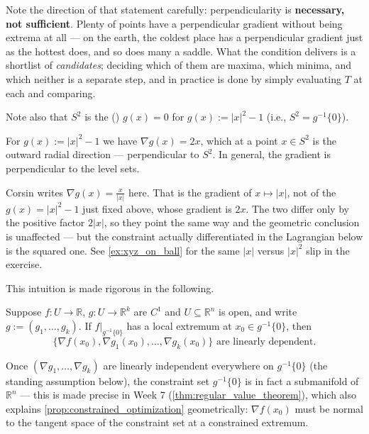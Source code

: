 Note the direction of that statement carefully: perpendicularity is \textbf{necessary, not
sufficient}. Plenty of points have a perpendicular gradient without being extrema at all --- on
the earth, the coldest place has a perpendicular gradient just as the hottest does, and so does
many a saddle. What the condition delivers is a shortlist of \emph{candidates}; deciding which
of them are maxima, which minima, and which neither is a separate step, and in practice is done
by simply evaluating $T$ at each and comparing.

Note also that $S^2$ is the  () $g(x) = 0$ for
$g(x) := |x|^2 - 1$ (i.e., $S^2 = g^{-1}\{0\}$).

\begin{remark}
For $g(x) := |x|^2-1$ we have $\nabla g(x) = 2x$, which at a point $x \in S^2$ is the outward
radial direction --- perpendicular to $S^2$. In general, the gradient is perpendicular to the
level sets.
\end{remark}

\begin{ainote}
Corsin writes $\nabla g(x) = \tfrac{x}{|x|}$ here. That is the gradient of $x \mapsto |x|$, not
of the $g(x) = |x|^2-1$ just fixed above, whose gradient is $2x$. The two differ only by the
positive factor $2|x|$, so they point the same way and the geometric conclusion is unaffected
--- but the constraint actually differentiated in the Lagrangian below is the squared one. See \cref{ex:xyz_on_ball} for the same $|x|$ versus $|x|^2$ slip in the exercise.
\end{ainote}

This intuition is made rigorous in the following.

\begin{proposition}
\label{prop:constrained_optimization}
Suppose $f : U \to \mathbb{R}$, $g : U \to \mathbb{R}^k$ are $C^1$ and $U \subseteq \mathbb{R}^n$
is open, and write $g := (g_1,\dots,g_k)$. If $f|_{g^{-1}\{0\}}$ has a local extremum at
$x_0 \in g^{-1}\{0\}$, then
\[\{\nabla f(x_0), \nabla g_1(x_0), \dots, \nabla g_k(x_0)\} \text{ are linearly dependent.}\]
\end{proposition}

\begin{remark}
Once $(\nabla g_1,\dots,\nabla g_k)$ are linearly independent everywhere on $g^{-1}\{0\}$ (the
standing assumption below), the constraint set $g^{-1}\{0\}$ is in fact a submanifold of
$\mathbb{R}^n$ --- this is made precise in Week 7 (\cref{thm:regular_value_theorem}), which also
explains \cref{prop:constrained_optimization} geometrically: $\nabla f(x_0)$ must be normal to the
tangent space of the constraint set at a constrained extremum.
\end{remark}

